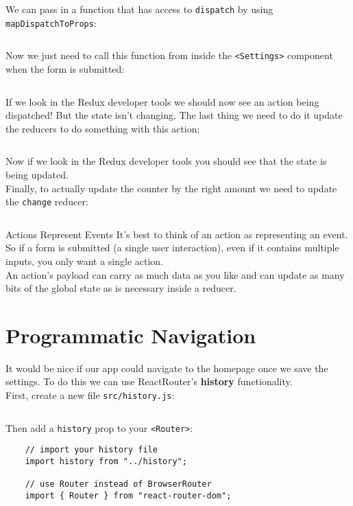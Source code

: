 We can pass in a function that has access to \texttt{dispatch} by using \texttt{mapDispatchToProps}:

\inputminted{js}{03/figures/07-Settings.js}

Now we just need to call this function from inside the \texttt{<Settings>} component when the form is submitted:

\inputminted{js}{03/figures/08-Settings.jsx}

If we look in the Redux developer tools we should now see an action being dispatched! But the state isn't changing. The last thing we need to do it update the reducers to do something with this action:

\inputminted{js}{03/figures/09-reducers.js}

Now if we look in the Redux developer tools you should see that the state is being updated.
\\

Finally, to actually update the counter by the right amount we need to update the \texttt{change} reducer:

\inputminted{js}{03/figures/10-change.js}


\begin{infobox}{Actions Represent Events}
    It's best to think of an action as representing an event. So if a form is submitted (a single user interaction), even if it contains multiple inputs, you only want a single action.
    \\

    An action's payload can carry as much data as you like and can update as many bits of the global state as is necessary inside a reducer.
\end{infobox}



\section{Programmatic Navigation}

It would be nice if our app could navigate to the homepage once we save the settings. To do this we can use ReactRouter's \textbf{history} functionality.
\\

First, create a new file \texttt{src/history.js}:

\inputminted{js}{03/figures/11-history.js}

Then add a \texttt{history} prop to your \texttt{<Router>}:

\begin{verbatim}
    // import your history file
    import history from "../history";

    // use Router instead of BrowserRouter
    import { Router } from "react-router-dom";
\end{verbatim}

